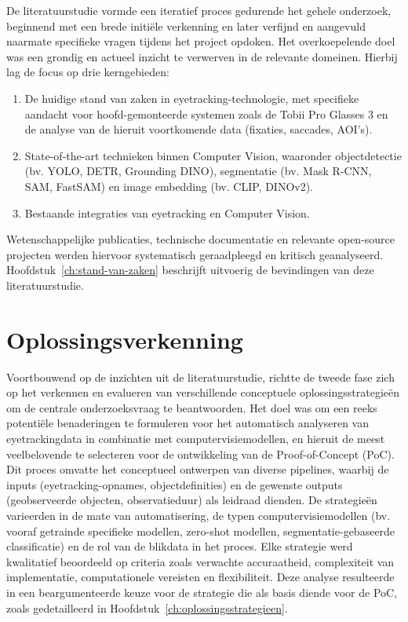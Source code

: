 De literatuurstudie vormde een iteratief proces gedurende het gehele onderzoek, beginnend met een brede initiële verkenning en 
later verfijnd en aangevuld naarmate specifieke vragen tijdens het project opdoken. 
Het overkoepelende doel was een grondig en actueel inzicht te verwerven in de relevante domeinen. 
Hierbij lag de focus op drie kerngebieden: 
\begin{enumerate}
\item De huidige stand van zaken in eyetracking-technologie, met specifieke aandacht voor hoofd-gemonteerde systemen zoals de Tobii Pro Glasses 3 en de analyse van de hieruit voortkomende data (fixaties, saccades, AOI's).
\item State-of-the-art technieken binnen Computer Vision, waaronder objectdetectie (bv. YOLO, DETR, Grounding DINO), segmentatie (bv. Mask R-CNN, SAM, FastSAM) en image embedding (bv. CLIP, DINOv2).
\item Bestaande integraties van eyetracking en Computer Vision.
\end{enumerate}
Wetenschappelijke publicaties, technische documentatie en relevante open-source projecten werden hiervoor systematisch 
geraadpleegd en kritisch geanalyseerd.
Hoofdstuk~\ref{ch:stand-van-zaken} beschrijft uitvoerig de bevindingen van deze literatuurstudie.

\section{Oplossingsverkenning}

Voortbouwend op de inzichten uit de literatuurstudie, richtte de tweede fase zich op het verkennen en evalueren van verschillende 
conceptuele oplossingsstrategieën om de centrale onderzoeksvraag te beantwoorden. 
Het doel was om een reeks potentiële benaderingen te formuleren voor het automatisch analyseren 
van eyetrackingdata in combinatie met computervisiemodellen, en hieruit de meest veelbelovende te 
selecteren voor de ontwikkeling van de Proof-of-Concept (PoC). 
Dit proces omvatte het conceptueel ontwerpen van diverse pipelines, waarbij de inputs (eyetracking-opnames, objectdefinities) 
en de gewenste outputs (geobserveerde objecten, observatieduur) als leidraad dienden. 
De strategieën varieerden in de mate van automatisering, de typen computervisiemodellen 
(bv. vooraf getrainde specifieke modellen, zero-shot modellen, segmentatie-gebaseerde classificatie) 
en de rol van de blikdata in het proces. 
Elke strategie werd kwalitatief beoordeeld op criteria zoals verwachte accuraatheid, complexiteit van implementatie, 
computationele vereisten en flexibiliteit. 
Deze analyse resulteerde in een beargumenteerde keuze voor de strategie die als basis diende voor de PoC, 
zoals gedetailleerd in Hoofdstuk~\ref{ch:oplossingsstrategieen}.

